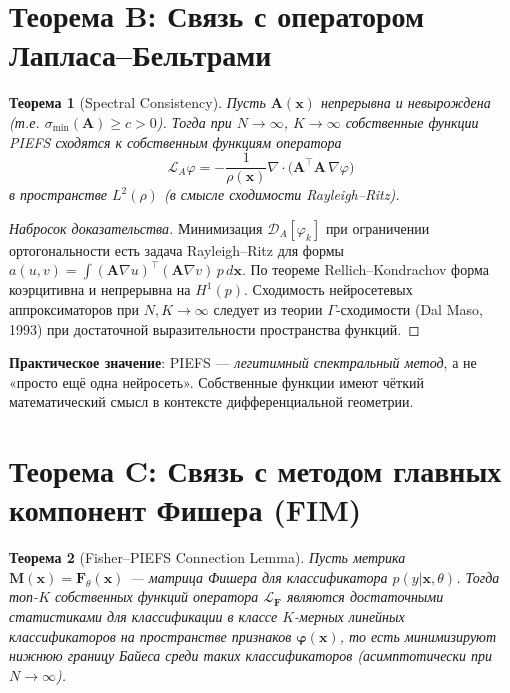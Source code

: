 \documentclass[14pt, a4paper, oneside]{extreport}
\theoremstyle{plain}
\newtheorem{theorem}{Теорема}[chapter]
\theoremstyle{definition}
\begin{document}
\section{Теорема B: Связь с оператором Лапласа--Бельтрами}

\begin{theorem}[Spectral Consistency]
Пусть $\mathbf{A}(\mathbf{x})$ непрерывна и невырождена (т.е. $\sigma_{\min}(\mathbf{A}) \geq c > 0$).
Тогда при $N\to\infty$, $K\to\infty$ собственные функции PIEFS сходятся к собственным функциям оператора
\[
  \mathcal{L}_A \varphi = -\frac{1}{\rho(\mathbf{x})} \nabla \cdot \bigl(\mathbf{A}^\top\mathbf{A}\,\nabla\varphi\bigr)
\]
в пространстве $L^2(\rho)$ (в смысле сходимости Rayleigh--Ritz).
\end{theorem}

\begin{proof}[Набросок доказательства]
Минимизация $\mathcal{D}_A[\varphi_k]$ при ограничении ортогональности есть задача Rayleigh--Ritz для формы $a(u,v) = \int (\mathbf{A}\nabla u)^\top(\mathbf{A}\nabla v)\,p\,d\mathbf{x}$.
По теореме Rellich--Kondrachov форма коэрцитивна и непрерывна на $H^1(p)$.
Сходимость нейросетевых аппроксиматоров при $N,K\to\infty$ следует из теории $\Gamma$-сходимости
(Dal Maso, 1993) при достаточной выразительности пространства функций.
\end{proof}

\noindent\textbf{Практическое значение}: PIEFS — \emph{легитимный спектральный метод}, а не «просто ещё одна нейросеть».
Собственные функции имеют чёткий математический смысл в контексте дифференциальной геометрии.

\section{Теорема C: Связь с методом главных компонент Фишера (FIM)}

\begin{theorem}[Fisher--PIEFS Connection Lemma]
Пусть метрика $\mathbf{M}(\mathbf{x}) = \mathbf{F}_\theta(\mathbf{x})$ — матрица Фишера для классификатора $p(y|\mathbf{x},\theta)$.
Тогда топ-$K$ собственных функций оператора $\mathcal{L}_{\mathbf{F}}$ являются достаточными статистиками для классификации
в классе $K$-мерных линейных классификаторов на пространстве признаков $\boldsymbol{\varphi}(\mathbf{x})$,
то есть минимизируют нижнюю границу Байеса среди таких классификаторов (асимптотически при $N\to\infty$).
\end{theorem}
\end{document}
